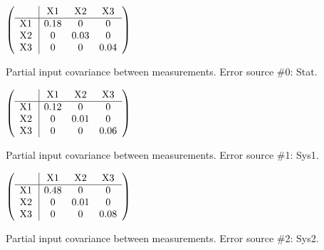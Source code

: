 \begin{table}[H]
\scriptsize
\begin{center}
\renewcommand{\arraystretch}{1.1}
\begin{math}\left(\begin{array}{c|ccc}
 & \mathrm{X1} & 
\mathrm{X2} & 
\mathrm{X3} \\
\hline
\mathrm{X1} \hspace*{2pt} &       0.18 &  0 &  0 \\
\mathrm{X2} \hspace*{2pt} &  0 &       0.03 &  0 \\
\mathrm{X3} \hspace*{2pt} &  0 &  0 &       0.04 \\
\end{array}\right)\end{math}
\caption{Partial input covariance between measurements. Error source \#0: Stat.}
\renewcommand{\arraystretch}{1}
\end{center}
\end{table}
\begin{table}[H]
\scriptsize
\begin{center}
\renewcommand{\arraystretch}{1.1}
\begin{math}\left(\begin{array}{c|ccc}
 & \mathrm{X1} & 
\mathrm{X2} & 
\mathrm{X3} \\
\hline
\mathrm{X1} \hspace*{2pt} &       0.12 &  0 &  0 \\
\mathrm{X2} \hspace*{2pt} &  0 &       0.01 &  0 \\
\mathrm{X3} \hspace*{2pt} &  0 &  0 &       0.06 \\
\end{array}\right)\end{math}
\caption{Partial input covariance between measurements. Error source \#1: Sys1.}
\renewcommand{\arraystretch}{1}
\end{center}
\end{table}
\begin{table}[H]
\scriptsize
\begin{center}
\renewcommand{\arraystretch}{1.1}
\begin{math}\left(\begin{array}{c|ccc}
 & \mathrm{X1} & 
\mathrm{X2} & 
\mathrm{X3} \\
\hline
\mathrm{X1} \hspace*{2pt} &       0.48 &  0 &  0 \\
\mathrm{X2} \hspace*{2pt} &  0 &       0.01 &  0 \\
\mathrm{X3} \hspace*{2pt} &  0 &  0 &       0.08 \\
\end{array}\right)\end{math}
\caption{Partial input covariance between measurements. Error source \#2: Sys2.}
\renewcommand{\arraystretch}{1}
\end{center}
\end{table}
